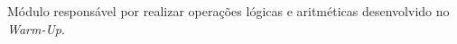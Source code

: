 \begin{dependencies}
    {Módulo responsável por realizar operações lógicas e aritméticas desenvolvido no \textit{Warm-Up}.}
\end{dependencies}